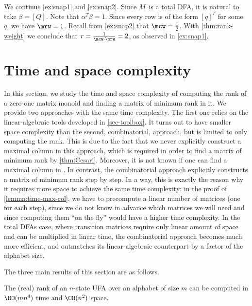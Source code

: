 \begin{exa} \label{ex:snap3}
We continue \autoref{ex:snap1} and \autoref{ex:snap2}.
Since $M$~is a total DFA, it is natural to take $\beta = [Q]$.
Note that $\alpha^T \beta = 1$.
Since every row is of the form $[q]^T$ for some~$q$, we have $\mrw = 1$.
Recall from \autoref{ex:snap2} that $\mcw = \frac12$.
With \autoref{thm:rank-weight} we conclude that $r = \frac{1}{\mcw \cdot \mrw} = 2$, as observed in \autoref{ex:snap1}.
\end{exa}


\section{Time and space complexity}\label{sec-time}
In this section, we study the time and space complexity of computing the rank of a zero-one matrix monoid and finding a matrix of minimum rank in it. We provide two approaches with the same time complexity. The first one relies on the linear-algebraic tools developed in \autoref{sec-toolbox}. It turns out to have smaller space complexity than the second, combinatorial, approach, but is limited to only computing the rank. This is due to the fact that we never explicitly construct a maximal column in this approach, which is required in order to find a matrix of minimum rank by \autoref{thm:Cesari}. Moreover, it is not known if one can find a maximal column in \NC. In contrast, the combinatorial approach explicitly constructs a matrix of minimum rank step by step. In a way, this is exactly the reason why it requires more space to achieve the same time complexity: in the proof of \autoref{lemma:time-max-col}, we have to precompute a linear number of matrices (one for each step), since we do not know in advance which matrices we will need and since computing them ``on the fly'' would have a higher time complexity.
In the total DFAs case, where transition matrices require only linear amount of space and can be multiplied in linear time, the combinatorial approach becomes much more efficient, and outmatches its linear-algebraic counterpart by a factor of the alphabet size.

The three main results of this section are as follows.

\begin{thm}\label{thm:linalg-time}
    The (real) rank of an $n$-state UFA over an alphabet of size $m$ can be computed in $\OO(mn^4)$ time and $\OO(n^2)$ space. 
\end{thm}


